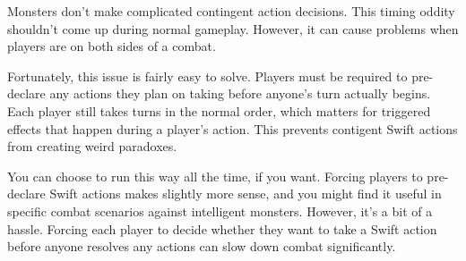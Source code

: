   Monsters don't make complicated contingent action decisions.
  This timing oddity shouldn't come up during normal gameplay.
  However, it can cause problems when players are on both sides of a combat.

  Fortunately, this issue is fairly easy to solve.
  Players must be required to pre-declare any  actions they plan on taking before anyone's turn actually begins.
  Each player still takes turns in the normal order, which matters for triggered effects that happen during a player's action.
  This prevents contigent Swift actions from creating weird paradoxes.

  You can choose to run this way all the time, if you want.
  Forcing players to pre-declare Swift actions makes slightly more sense, and you might find it useful in specific combat scenarios against intelligent monsters.
  However, it's a bit of a hassle.
  Forcing each player to decide whether they want to take a Swift action before anyone resolves any actions can slow down combat significantly.
